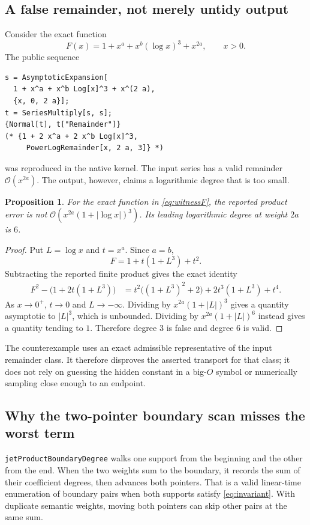 \documentclass[11pt,letterpaper]{article}
\newcommand{\code}[1]{{\small\nolinkurl{#1}}}
\newcommand{\OO}{\mathcal O}
\newtheorem{proposition}{Proposition}[section]
\begin{document}
\subsection{A false remainder, not merely untidy output}
Consider the exact function
\begin{equation}
 F(x)=1+x^a+x^b(\log x)^3+x^{2a},\qquad x>0.
 \label{eq:witnessF}
\end{equation}
The public sequence
\begin{lstlisting}
s = AsymptoticExpansion[
  1 + x^a + x^b Log[x]^3 + x^(2 a),
  {x, 0, 2 a}];
t = SeriesMultiply[s, s];
{Normal[t], t["Remainder"]}
(* {1 + 2 x^a + 2 x^b Log[x]^3,
     PowerLogRemainder[x, 2 a, 3]} *)
\end{lstlisting}
was reproduced in the native kernel. The input series has a valid remainder $\OO(x^{2a})$. The output, however, claims a logarithmic degree that is too small.

\begin{proposition}
For the exact function in \eqref{eq:witnessF}, the reported product error is not
$\OO(x^{2a}(1+|\log x|)^3)$. Its leading logarithmic degree at weight $2a$ is $6$.
\end{proposition}
\begin{proof}
Put $L=\log x$ and $t=x^a$. Since $a=b$,
\[
 F=1+t(1+L^3)+t^2.
\]
Subtracting the reported finite product gives the exact identity
\begin{align}
 F^2-\bigl(1+2t(1+L^3)\bigr)
 &=t^2\bigl((1+L^3)^2+2\bigr)
   +2t^3(1+L^3)+t^4.\label{eq:squareerror}
\end{align}
As $x\to0^+$, $t\to0$ and $L\to-\infty$. Dividing by $x^{2a}(1+|L|)^3$ gives a quantity asymptotic to $|L|^3$, which is unbounded. Dividing by $x^{2a}(1+|L|)^6$ instead gives a quantity tending to $1$. Therefore degree $3$ is false and degree $6$ is valid.
\end{proof}

The counterexample uses an exact admissible representative of the input remainder class. It therefore disproves the asserted transport for that class; it does not rely on guessing the hidden constant in a big-$O$ symbol or numerically sampling close enough to an endpoint.

\subsection{Why the two-pointer boundary scan misses the worst term}
\code{jetProductBoundaryDegree} walks one support from the beginning and the other from the end. When the two weights sum to the boundary, it records the sum of their coefficient degrees, then advances both pointers. That is a valid linear-time enumeration of boundary pairs when both supports satisfy \eqref{eq:invariant}. With duplicate semantic weights, moving both pointers can skip other pairs at the same sum.\cite{core}
\end{document}
